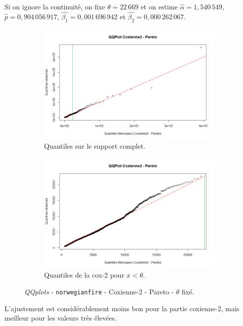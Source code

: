 		Si on ignore la continuité, on fixe $\theta = 22\,669$ et on estime $\hat{\alpha} = 1,540\,549$, $\hat{p} =0,904\,056\,917$, $\hat{\beta_1}=0,001\,696\,942$ et $\hat{\beta_2} = 0,000\,262\,067$.
		
		\begin{figure}[H]
			\begin{center}
				\begin{subfigure}[b]{0.45\textwidth}
					\includegraphics[scale=0.35]{Graphiques/QQ_Cox_pa_choix} 
					\caption{Quantiles sur le support complet.} \label{QQplot_Cox_pa_choix}
				\end{subfigure}
				\begin{subfigure}[b]{0.4\textwidth}
					\includegraphics[scale=0.35]{Graphiques/QQ_Cox_pa_choix_t1} 
					\caption{Quantiles de la cox-2 pour $x<\theta$.} \label{QQplot_Cox_pa_choix_2}
				\end{subfigure}
				\renewcommand{\figurename}{Illustration}
				\caption{\textit{QQplots} - \texttt{norwegianfire} - Coxienne-2 - Pareto - $\theta$ fixé.}
			\end{center}
		\end{figure}
		L'ajustement est considérablement moins bon pour la partie coxienne-2, mais meilleur pour les valeurs très élevées.
		 
